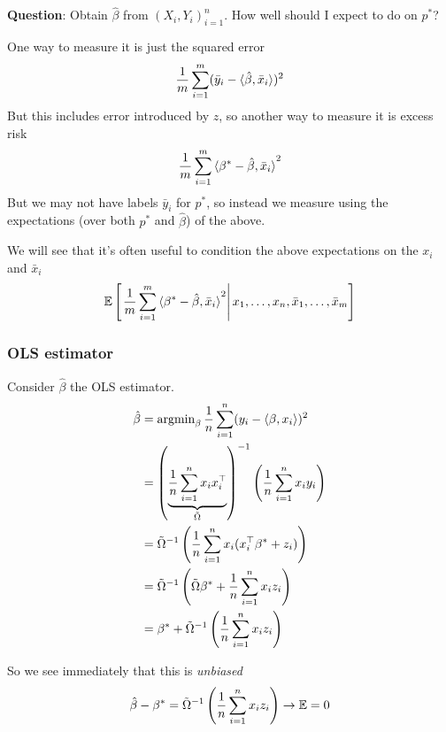 \textbf{Question}: Obtain $\hat{\beta}$ from $(X_i, Y_i)_{i=1}^n$.
How well should I expect to do on $p^*$?

One way to measure it is just the squared error
\begin{align}
  \frac{1}{m} \sum_{i=1}^m (\bar{y}_i - \braket{\hat{\beta}, \bar{x}_i})^2
\end{align}
But this includes error introduced by $z$, so another way to measure
it is excess risk
\begin{align}
  \frac{1}{m} \sum_{i=1}^m \braket{\beta^* - \hat{\beta}, \bar{x}_i}^2
\end{align}
But we may not have labels $\bar{y}_i$ for $p^*$, so instead we measure
using the expectations (over both $p^*$ and $\hat\beta$) of the above.

We will see that it's often useful to condition the above expectations
on the $x_i$ and $\bar{x}_i$
\begin{align}
  \mathbb{E}\left[\left.
      \frac{1}{m} \sum_{i=1}^m \braket{\beta^* - \hat{\beta}, \bar{x}_i}^2
      \right\vert
      x_1,\ldots,x_n,\bar{x}_1,\ldots,\bar{x}_m
    \right]
  \end{align}


  \subsubsection{OLS estimator}

  Consider $\hat{\beta}$ the OLS estimator.
  \begin{align}
    \hat{\beta}
    &= \operatorname{argmin}_\beta \frac{1}{n} \sum_{i=1}^n (y_i - \braket{\beta, x_i})^2 \\
    &= \left(
      \underbrace{
	\frac{1}{n} \sum_{i=1}^n x_i x_i^\top
      }_{\tilde{\Omega}}
    \right)^{-1}
    \left(
      \frac{1}{n} \sum_{i=1}^n x_i y_i
    \right) \\
    &= \tilde{\Omega}^{-1}\left(
      \frac{1}{n} \sum_{i=1}^n x_i (x_i^\top \beta^* + z_i)
    \right) \\
    &= \tilde{\Omega}^{-1} \left(\tilde{\Omega} \beta^* + \frac{1}{n} \sum_{i=1}^n x_i z_i\right) \\
    &= \beta^* + \tilde{\Omega}^{-1} \left(
      \frac{1}{n}  \sum_{i=1}^n x_i z_i
    \right)
  \end{align}

  So we see immediately that this is \emph{unbiased}
  \begin{align}
    \hat\beta - \beta^* = \tilde{\Omega}^{-1}\left(
      \frac{1}{n} \sum_{i=1}^n x_i z_i
    \right) \to \mathbb{E} = 0
  \end{align}

